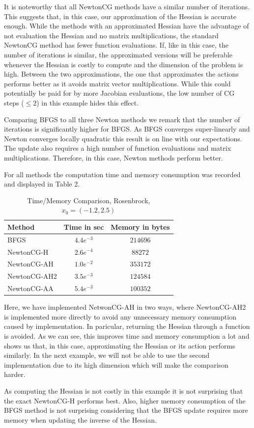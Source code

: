 \documentclass{article}
\begin{document}
It is noteworthy that all NewtonCG methods have a similar number of iterations. This suggests
that, in this case, our approximation of the Hessian is accurate enough. While the methods
with an approximated Hessian have the advantage of not evaluation the Hessian and no matrix
multiplications, the standard NewtonCG method has fewer function evaluations. If, like in this case, the number of iterations is similar, the approximated versions will be preferable whenever
the Hessian is costly to compute and the dimension of the problem is high. Between the two approximations, the one that approximates the actions performs better as it avoids matrix vector multiplications. While this could potentially be paid for by more Jacobian  evaluations, the low number
of CG steps ($\leq 2$) in this example hides this effect. \par
Comparing BFGS to all three Newton methods we remark that the number of iterations is significantly higher for BFGS. As BFGS converges super-linearly and Newton converges locally quadratic this
result is on line with our expectations. The update also requires a high number of function evaluations and matrix multiplications. Therefore, in this case, Newton methods perform better.\par
For all methods the computation time and memory consumption was recorded and displayed in Table 2.
\begin{table}[H]
  \centering
  \begin{tabular}{|l|c|c|}
    \hline
   \textbf{Method} & \textbf{Time} in sec & \textbf{Memory} in bytes \\ \hline
  BFGS &$4.4e^{-3}$ &$214696$  \\ \hline
  NewtonCG-H &$2.6e^{-4}$ &$88272$  \\ \hline
  NewtonCG-AH&$1.0e^{-2}$ &$353172$  \\ \hline
  NewtonCG-AH2&$3.5e^{-3}$ &$ 124584$\\ \hline
  NewtonCG-AA&$5.4e^{-3}$ &$100352$  \\ \hline
  \end{tabular}
  \label{time1}
  \caption{Time/Memory Comparison, Rosenbrock, $x_{0}=(-1.2,2.5)$}
\end{table}
Here, we have implemented NetwonCG-AH in two ways, where NewtonCG-AH2 is implemented more
directly to avoid any unnecessary memory consumption caused by implementation. In paricular, returning the Hessian through a function is avoided. As we can see, this improves time and
memory consumption a lot and shows us that, in this case, approximating the Hessian or its
action performs similarly. In the next example, we will not be able to use the second implementation due to its high dimension which will make the comparison harder. \par
As computing the Hessian is not costly in this example it is not surprising that the exact NewtonCG-H performs best. Also, higher memory consumption of the BFGS method is not surprising
considering that the BFGS update requires more memory when updating the inverse of the Hessian.
\end{document}
